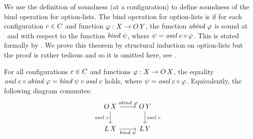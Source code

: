 We use the definition of soundness (at a configuration) to define soundness of the bind operation for option-lists.
The bind operation for option-lists is  if for each configuration $\cE \in \cS$ and function $\varphi : \Val \to \OLst[\ValY]$, the function $\obind\ \varphi$ is sound at \cE\ and with respect to the function $\lbind\ \psi$, where $\psi = \osel\ \cE \comp \varphi$.
This is stated formally by .
We prove this theorem by structural induction on option-lists but the proof is rather tedious and so it is omitted here, see .

\begin{theorem}
  \label{thm:bind}
  For all configurations $\cE \in \cS$ and functions $\varphi : \Val \to \OLst$, the equality
  $
    \osel\ \cE \comp \obind\ \varphi = \lbind\ \psi \comp \osel\ \cE
  $
  holds, where $\psi = \osel\ \cE \comp \varphi$.
  Equivalently, the following diagram commutes:
  $$
    \begin{tikzcd}
      \OLst \ar[d, "\osel\ \cE"'] \ar[r, "\obind\ \varphi"] &
      \OLst[\ValY] \ar[d, "\osel\ \cE"] \\
      \Lst \ar[r, "\lbind\ \psi"'] &
      \Lst[\ValY]
    \end{tikzcd}
  $$
\end{theorem}
